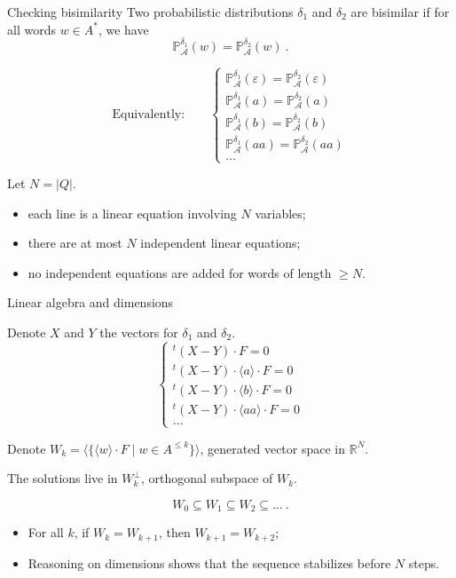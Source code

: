 \documentclass[svgnames]{beamer}
\renewcommand{\AA}{\mathcal{A}}
\newcommand{\RR}{\mathbb{R}}
\newcommand{\tr}[1]{\langle #1 \rangle}
\newcommand{\prob}[1]{\mathbb{P}_{#1}}
\newcommand{\set}[1]{\{ #1 \}}
\begin{document}
\begin{frame}{Checking bisimilarity}
Two probabilistic distributions $\delta_1$ and $\delta_2$ are bisimilar if for all words $w \in A^*$,
we have 
$$\prob{\AA}^{\delta_1}(w) = \prob{\AA}^{\delta_2}(w)\ .$$


$$\textrm{Equivalently:} \qquad \left\{
\begin{array}{c}
\prob{\AA}^{\delta_1}(\varepsilon) = \prob{\AA}^{\delta_2}(\varepsilon) \\[1ex]
\prob{\AA}^{\delta_1}(a) = \prob{\AA}^{\delta_2}(a) \\[1ex]
\prob{\AA}^{\delta_1}(b) = \prob{\AA}^{\delta_2}(b) \\[1ex]
\prob{\AA}^{\delta_1}(aa) = \prob{\AA}^{\delta_2}(aa) \\[1ex]
\ldots
\end{array}
\right.$$

\pause
Let $N = |Q|$.
\begin{itemize}
	\item each line is a linear equation involving $N$ variables;
	\item there are at most $N$ independent linear equations;
	\item no independent equations are added for words of length $\ge N$.
\end{itemize}
\end{frame}

\begin{frame}{Linear algebra and dimensions}

Denote $X$ and $Y$ the vectors for $\delta_1$ and $\delta_2$.
$$\left\{
\begin{array}{c}
{}^t (X-Y) \cdot F = 0 \\[1ex]
{}^t (X-Y) \cdot \tr{a} \cdot F = 0 \\[1ex]
{}^t (X-Y) \cdot \tr{b} \cdot F = 0 \\[1ex]
{}^t (X-Y) \cdot \tr{aa} \cdot F = 0 \\[1ex]
\ldots
\end{array}
\right.$$

\pause
Denote $W_k = \langle \set{ \tr{w} \cdot F \mid w \in A^{\le k} } \rangle$, generated vector space in $\RR^N$.

The solutions live in $W_k^{\bot}$, orthogonal subspace of $W_k$.

\pause
$$W_0 \subseteq W_1 \subseteq W_2 \subseteq \ldots \ .$$

\begin{itemize}
	\item For all $k$, if $W_k = W_{k+1}$, then $W_{k+1} = W_{k+2}$;
	\item Reasoning on dimensions shows that the sequence stabilizes before $N$ steps.
\end{itemize}
\end{frame}
\end{document}
